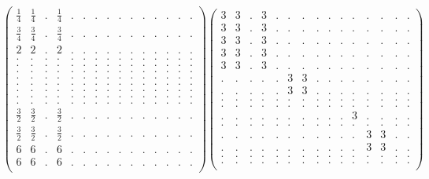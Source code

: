 \documentclass[12pt,a4paper]{amsart}
\begin{document}
\begin{align*}
\left(\begin{array}{rrrrrrrrrrrrrrr}%
\frac14&\frac14&.&\frac14&.&.&.&.&.&.&.&.&.&.&.\\%
\frac34&\frac34&.&\frac34&.&.&.&.&.&.&.&.&.&.&.\\%
2&2&.&2&.&.&.&.&.&.&.&.&.&.&.\\%
.&.&.&.&.&.&.&.&.&.&.&.&.&.&.\\%
.&.&.&.&.&.&.&.&.&.&.&.&.&.&.\\%
.&.&.&.&.&.&.&.&.&.&.&.&.&.&.\\%
.&.&.&.&.&.&.&.&.&.&.&.&.&.&.\\%
.&.&.&.&.&.&.&.&.&.&.&.&.&.&.\\%
.&.&.&.&.&.&.&.&.&.&.&.&.&.&.\\%
.&.&.&.&.&.&.&.&.&.&.&.&.&.&.\\%
.&.&.&.&.&.&.&.&.&.&.&.&.&.&.\\%
\frac32&\frac32&.&\frac32&.&.&.&.&.&.&.&.&.&.&.\\%
\frac32&\frac32&.&\frac32&.&.&.&.&.&.&.&.&.&.&.\\%
6&6&.&6&.&.&.&.&.&.&.&.&.&.&.\\%
6&6&.&6&.&.&.&.&.&.&.&.&.&.&.\\%
\end{array}\right)%
\left(\begin{array}{rrrrrrrrrrrrrrr}%
3&3&.&3&.&.&.&.&.&.&.&.&.&.&.\\%
3&3&.&3&.&.&.&.&.&.&.&.&.&.&.\\%
3&3&.&3&.&.&.&.&.&.&.&.&.&.&.\\%
3&3&.&3&.&.&.&.&.&.&.&.&.&.&.\\%
3&3&.&3&.&.&.&.&.&.&.&.&.&.&.\\%
.&.&.&.&.&3&3&.&.&.&.&.&.&.&.\\%
.&.&.&.&.&3&3&.&.&.&.&.&.&.&.\\%
.&.&.&.&.&.&.&.&.&.&.&.&.&.&.\\%
.&.&.&.&.&.&.&.&.&.&.&.&.&.&.\\%
.&.&.&.&.&.&.&.&.&.&3&.&.&.&.\\%
.&.&.&.&.&.&.&.&.&.&.&.&.&.&.\\%
.&.&.&.&.&.&.&.&.&.&.&3&3&.&.\\%
.&.&.&.&.&.&.&.&.&.&.&3&3&.&.\\%
.&.&.&.&.&.&.&.&.&.&.&.&.&.&.\\%
.&.&.&.&.&.&.&.&.&.&.&.&.&.&.\\%
\end{array}\right)%
\end{align*}
\end{document}
